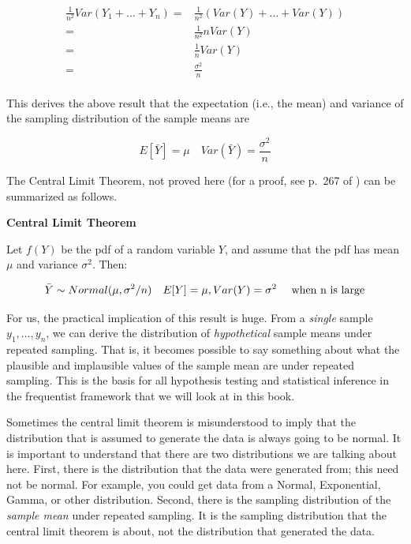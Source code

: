 \documentclass[12pt,]{krantz}
\begin{document}
\begin{equation} \label{sdsmderivation}
\begin{split}
\frac{1}{n^2} Var(Y_1 + \dots + Y_n) =& \frac{1}{n^2} (Var(Y) + \dots + Var(Y))\\
=&  \frac{1}{n^2}  n Var(Y)\\
=&  \frac{1}{n}  Var(Y)\\
=&  \frac{\sigma^2}{n}\\
\end{split}
\end{equation}

This derives the above result that the expectation (i.e., the mean) and variance of the sampling distribution of the sample means are

\begin{equation}
E[\bar{Y}] = \mu \quad Var(\bar{Y}) = \frac{\sigma^2}{n}
\end{equation}

The Central Limit Theorem, not proved here (for a proof, see p.~267 of \citet{millermiller}) can be summarized as follows.

\textbf{Central Limit Theorem}

Let \(f(Y)\) be the pdf of a random variable \(Y\), and assume that the pdf has mean \(\mu\) and variance \(\sigma^2\). Then:

\begin{equation}
\bar{Y} \sim Normal(\mu,\sigma^2/n) \quad  E[Y]=\mu,Var(Y)=\sigma^2 \quad \hbox{ when n is large}
\end{equation}

For us, the practical implication of this result is huge. From a \emph{single} sample \(y_1,\dots, y_n\), we can derive the distribution of \emph{hypothetical} sample means under repeated sampling. That is, it becomes possible to say something about what the plausible and implausible values of the sample mean are under repeated sampling. This is the basis for all hypothesis testing and statistical inference in the frequentist framework that we will look at in this book.

Sometimes the central limit theorem is misunderstood to imply that the distribution that is assumed to generate the data is always going to be normal. It is important to understand that there are two distributions we are talking about here. First, there is the distribution that the data were generated from; this need not be normal. For example, you could get data from a Normal, Exponential, Gamma, or other distribution. Second, there is the sampling distribution of the \emph{sample mean} under repeated sampling. It is the sampling distribution that the central limit theorem is about, not the distribution that generated the data.
\end{document}
